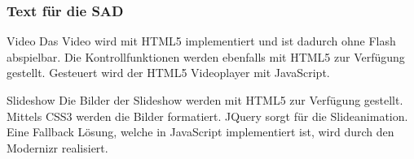 \begin{frame} %
  \frametitle{Text für die SAD} %


 
  
  \begin{block}{Video}
  	Das Video wird mit HTML5 implementiert und ist dadurch ohne Flash abspielbar. Die Kontrollfunktionen
  	werden ebenfalls mit HTML5 zur Verfügung gestellt. Gesteuert wird der HTML5 Videoplayer mit JavaScript.
  \end{block}
    
  \begin{block}{Slideshow}
    Die Bilder der Slideshow werden mit HTML5 zur Verfügung gestellt. Mittels CSS3 werden die Bilder formatiert.
    JQuery sorgt für die Slideanimation. Eine Fallback Lösung, welche in JavaScript implementiert ist, wird durch
    den Modernizr realisiert.
  \end{block}

\end{frame}